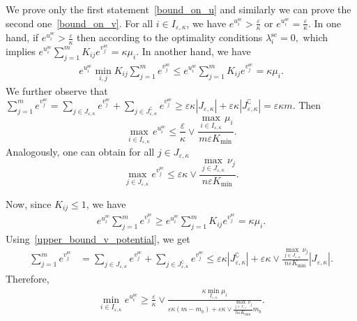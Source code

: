 We prove only the first statement~\eqref{bound_on_u} and similarly we can prove the second one~\eqref{bound_on_v}.
For all $i\in I_{\varepsilon,\kappa}$, we have $e^{u^{\text{sc}}_i} > \frac \varepsilon\kappa$ or $e^{u^{\text{sc}}_i} = \frac \varepsilon\kappa$. In one hand, if $e^{u^{\text{sc}}_i} > \frac \varepsilon\kappa$ then according to the optimality conditions $\lambda^{\text{sc}}_i = 0,$ which implies $e^{u^{\text{sc}}_i} \sum_{j=1}^m K_{ij} e^{v^{\text{sc}}_j} = \kappa\mu_i$.
In another hand, we have 
\begin{align*}
e^{u^{\text{sc}}_i} \min_{i,j}K_{ij} \sum_{j=1}^m e^{v^{\text{sc}}_j} \leq e^{u^{\text{sc}}_i} \sum_{j=1}^m K_{ij} e^{v^{\text{sc}}_j} = \kappa\mu_i.
\end{align*}
We further observe that $\sum_{j=1}^m e^{v^{\text{sc}}_j} = \sum_{j \in J_{\varepsilon,\kappa}} e^{v^{\text{sc}}_j} + \sum_{j \in J^\complement_{\varepsilon,\kappa}} e^{v^{\text{sc}}_j} \geq \varepsilon\kappa |J_{\varepsilon,\kappa}| + \varepsilon\kappa |J^\complement_{\varepsilon,\kappa}|=\varepsilon\kappa m.$ Then
\begin{equation*}
\max_{i\in I_{\varepsilon,\kappa}} e^{u^{\text{sc}}_i} \leq \frac \varepsilon\kappa \vee \frac{\max_{i\in I_{\varepsilon,\kappa}}\mu_i}{m\varepsilon K_{\min}}.
\end{equation*}
Analogously, one can obtain for all $j\in J_{\varepsilon,\kappa}$
\begin{equation}
\label{upper_bound_v_potential}
\max_{j\in J_{\varepsilon,\kappa}}e^{v^{\text{sc}}_j} \leq \varepsilon\kappa \vee \frac{\max_{j \in J_{\varepsilon,\kappa}} \nu_j}{n\varepsilon K_{\min}}.
\end{equation}

Now, since $K_{ij} \leq 1$, we have 
\begin{align*}
e^{u^{\text{sc}}_i} \sum_{j=1}^m e^{v^{\text{sc}}_j} \geq e^{u^{\text{sc}}_i} \sum_{j=1}^m K_{ij}e^{v^{\text{sc}}_j} = \kappa\mu_i.
\end{align*}
Using~\eqref{upper_bound_v_potential}, we get 
\begin{align*}
\sum_{j=1}^m e^{v^{\text{sc}}_j} &= \sum_{j \in J_{\varepsilon,\kappa}} e^{v^{\text{sc}}_j} + \sum_{j \in J^\complement_{\varepsilon,\kappa}} e^{v^{\text{sc}}_j}
\leq \varepsilon\kappa |J^\complement_{\varepsilon,\kappa}| + \varepsilon\kappa \vee \frac{\max_{j\in J_{\varepsilon,\kappa}} \nu_j}{n\varepsilon K_{\min}} |J_{\varepsilon,\kappa}|.
\end{align*}
Therefore,
\begin{align*}
\min_{i \in I_{\varepsilon,\kappa}} e^{u^{\text{sc}}_i}  \geq \frac \varepsilon\kappa \vee \frac{\kappa\min_{I_{\varepsilon,\kappa}}\mu_i}{\varepsilon\kappa (m-m_b) + \varepsilon\kappa \vee \frac{\max_{j\in J_{\varepsilon,\kappa}} \nu_j}{n\varepsilon K_{\min}} m_b}.
\end{align*}

